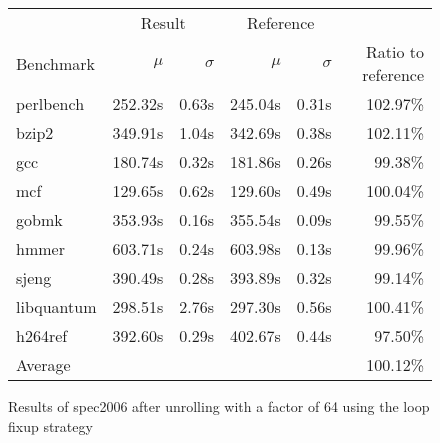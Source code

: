 \begin{figure}[h]
    \begin{center}
        \begin{tabular}{lrrrrr}
            \toprule
            & \multicolumn{2}{c}{Result} & \multicolumn{2}{c}{Reference}\\
            Benchmark & $\mu$ & $\sigma$ & $\mu$ & $\sigma$ & Ratio to reference\\
            \midrule
            perlbench & 252.32s & 0.63s & 245.04s & 0.31s & 102.97\%\\
            bzip2 & 349.91s & 1.04s & 342.69s & 0.38s & 102.11\%\\
            gcc & 180.74s & 0.32s & 181.86s & 0.26s & 99.38\%\\
            mcf & 129.65s & 0.62s & 129.60s & 0.49s & 100.04\%\\
            gobmk & 353.93s & 0.16s & 355.54s & 0.09s & 99.55\%\\
            hmmer & 603.71s & 0.24s & 603.98s & 0.13s & 99.96\%\\
            sjeng & 390.49s & 0.28s & 393.89s & 0.32s & 99.14\%\\
            libquantum & 298.51s & 2.76s & 297.30s & 0.56s & 100.41\%\\
            h264ref & 392.60s & 0.29s & 402.67s & 0.44s & 97.50\%\\
            \midrule
            Average & & & & & 100.12\%\\
            \bottomrule
        \end{tabular}
    \end{center}
    \caption{Results of spec2006 after unrolling with a factor of 64 using the loop fixup strategy}
    \label{fig:eval:perf:loop:64}
\end{figure}
